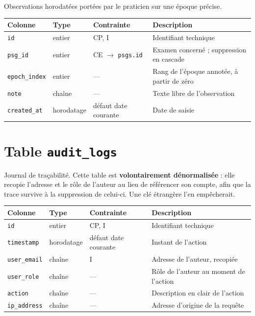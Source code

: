 Observations horodatées portées par le praticien sur une époque précise.

\begin{table}[H]
\centering
\small
\begin{tabular}{@{}lllL{6.0cm}@{}}
\toprule
\textbf{Colonne} & \textbf{Type} & \textbf{Contrainte} & \textbf{Description} \\
\midrule
\texttt{id}          & entier     & CP, I & Identifiant technique \\
\texttt{psg\_id}     & entier     & CE $\to$ \texttt{psgs.id} & Examen concerné ;
                                             suppression en cascade \\
\texttt{epoch\_index}& entier     & --- & Rang de l'époque annotée, à partir de zéro \\
\texttt{note}        & chaîne     & --- & Texte libre de l'observation \\
\texttt{created\_at} & horodatage & défaut date courante & Date de saisie \\
\bottomrule
\end{tabular}
\end{table}

\section{Table \texttt{audit\_logs}}

Journal de traçabilité. Cette table est \textbf{volontairement dénormalisée} : elle
recopie l'adresse et le rôle de l'auteur au lieu de référencer son compte, afin que la
trace survive à la suppression de celui-ci. Une clé étrangère l'en empêcherait.

\begin{table}[H]
\centering
\small
\begin{tabular}{@{}lllL{6.0cm}@{}}
\toprule
\textbf{Colonne} & \textbf{Type} & \textbf{Contrainte} & \textbf{Description} \\
\midrule
\texttt{id}          & entier     & CP, I & Identifiant technique \\
\texttt{timestamp}   & horodatage & défaut date courante & Instant de l'action \\
\texttt{user\_email} & chaîne     & I & Adresse de l'auteur, recopiée \\
\texttt{user\_role}  & chaîne     & --- & Rôle de l'auteur au moment de l'action \\
\texttt{action}      & chaîne     & --- & Description en clair de l'action \\
\texttt{ip\_address} & chaîne     & --- & Adresse d'origine de la requête \\
\bottomrule
\end{tabular}
\end{table}


